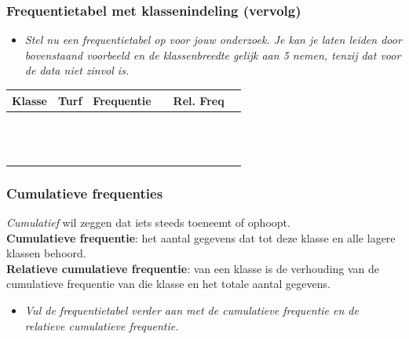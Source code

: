 \documentclass[dutch]{beamer}
\newcommand{\vraag}[1]{\begin{itemize}\item[Vraag:] {\it #1}\end{itemize}}
\begin{document}
\begin{frame}
\frametitle{Frequentietabel met klassenindeling (vervolg)}
\vraag{Stel nu een frequentietabel op voor jouw onderzoek. Je kan je laten leiden door bovenstaand
voorbeeld en de klassenbreedte gelijk aan 5 nemen, tenzij dat voor de data niet zinvol is.}
\begin{center}
  \begin{tabular}{|p{1.5cm}|p{1.5cm}|p{1.5cm}|p{1.5cm}|p{1.5cm}|p{1.5cm}|}
    \hline
    Klasse & Turf & Frequentie &&Rel. Freq&\\
    \hline&&&&&\\\hline&&&&&\\\hline&&&&&\\\hline&&&&&\\\hline&&&&&\\
    \hline&&&&&\\\hline&&&&&\\\hline&&&&&\\\hline&&&&&\\\hline&&&&&\\
    \hline&&&&&\\\hline&&&&&\\\hline&&&&&\\\hline
  \end{tabular}
\end{center}
\end{frame}

\begin{frame}
\frametitle{Cumulatieve frequenties}
{\it Cumulatief} wil zeggen dat iets steeds toeneemt of ophoopt.\\
\vspace*{0.5cm}
\pause
{\bf Cumulatieve frequentie}: het aantal gegevens dat tot deze klasse en alle lagere klassen behoord.\\
{\bf Relatieve cumulatieve frequentie}: van een klasse is de verhouding van de cumulatieve frequentie van die klasse en het totale aantal gegevens.

\vraag{Vul de frequentietabel verder aan met de cumulatieve frequentie en de relatieve cumulatieve frequentie.}
\end{frame}
\end{document}
